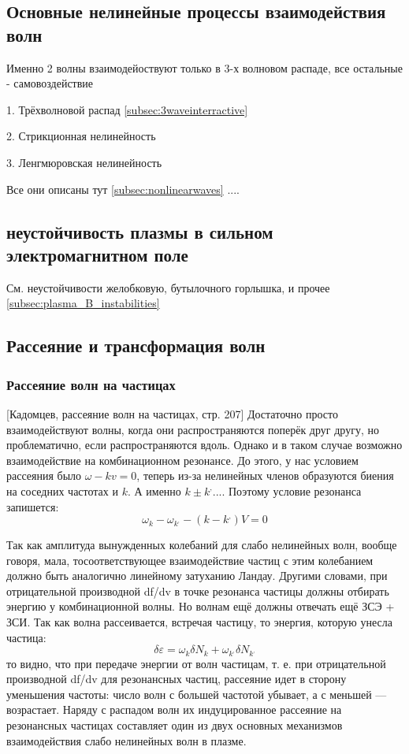 \documentclass[10pt, a4paper]{article}
\begin{document}
\subsection{Основные нелинейные процессы взаимодействия волн}
Именно 2 волны взаимодейоствуют только в 3-х волновом распаде, все остальные - самовоздействие

1. Трёхволновой распад \ref{subsec:3waveinterractive} 

2. Стрикционная нелинейность 

3. Ленгмюровская нелинейность

Все они описаны тут \ref{subsec:nonlinearwaves}
....


\subsection{неустойчивость плазмы в сильном электромагнитном поле}
См. неустойчивости желобковую, бутылочного горлышка, и прочее  \ref{subsec:plasma_B_instabilities}


\subsection{Рассеяние и трансформация волн}
\subsubsection{Рассеяние волн на частицах}
[Кадомцев, рассеяние волн на частицах, стр. 207]
Достаточно просто взаимодействуют волны, когда они распространяются поперёк друг другу, но проблематично, если распространяются вдоль.
Однако и в таком случае возможно взаимодействие на комбинационном резонансе. До этого, у нас условием рассеяния было $\omega-kv=0$, теперь из-за нелинейных членов образуются биения на соседних частотах и $k$. А именно $k \pm k^{,}$....
Поэтому условие резонанса запишется:
\begin{equation}
	\omega_k - \omega_{k^{,}} - (k-k^{,})V=0
\end{equation}

Так как амплитуда вынужденных колебаний для слабо нелинейных волн, вообще говоря, мала, тосоответствующее взаимодействие частиц с этим колебанием должно быть аналогично линейному затуханию Ландау. Другими словами, при отрицательной производной df/dv в точке резонанса частицы должны отбирать энергию у комбинационной волны.
Но волнам ещё должны отвечать ещё ЗСЭ + ЗСИ.
Так как волна рассеивается, встречая частицу, то энергия, которую унесла частица:
 \begin{equation}
 	\delta \varepsilon=\omega_k \delta N_k + \omega_{k^{,}} \delta N_{k^{,}}
 \end{equation}
то видно, что при передаче энергии от волн частицам, 
т. е. при отрицательной производной df/dv для резонансных частиц, рассеяние идет в сторону уменьшения частоты: число волн с большей частотой убывает, а с меньшей — возрастает. 
Наряду с распадом волн их индуцированное рассеяние на резонансных частицах составляет один из двух основных механизмов взаимодействия слабо нелинейных волн в плазме. 
\end{document}
